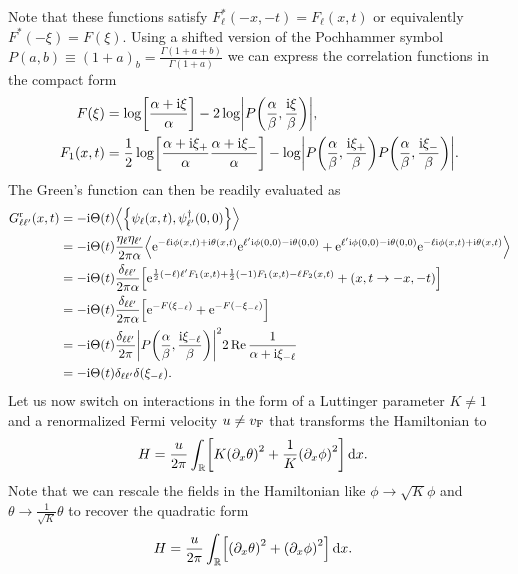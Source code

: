\documentclass[english, parskip=full]{scrartcl}
\begin{document}
Note that these functions satisfy $F_\ell^\ast(-x,-t) = F_\ell(x,t)$ or equivalently $F^\ast(-\xi) = F(\xi)$.
Using a shifted version of the Pochhammer symbol $P(a,b) \equiv (1+a)_b  = \frac{\Gamma(1+a+b)}{\Gamma(1+a)}$ we can express the correlation functions in the compact form
\begin{align}
F(\xi) &= \log\klb*{\frac{\alpha + \i\xi}{\alpha}} - 2\log\abs*{P\kla*{\frac{\alpha}{\beta}, \frac{\i\xi}{\beta}}},\\
F_1(x,t) &= \frac{1}{2} \log\klb*{\frac{\alpha + \i\xi_+}{\alpha} \frac{\alpha + \i\xi_-}{\alpha}} - \log\abs*{P\kla*{\frac{\alpha}{\beta}, \frac{\i \xi_+}{\beta}} P\kla*{\frac{\alpha}{\beta}, \frac{\i \xi_-}{\beta}}}.
\end{align}
The Green's function can then be readily evaluated as
\begin{align}
G^\r_{\ell\ell'}(x,t) &= -\i\Theta(t) \bra*{\klc*{\psi_\ell(x,t), \psi_{\ell'}^\dagger(0,0)}} \\
&= -\i\Theta(t) \frac{\eta_\ell\eta_{\ell'}}{2\pi\alpha} \bra*{\powe{-\ell\i \phi(x,t) + \i\theta(x,t)} \powe{\ell'\i \phi(0,0) - \i\theta(0,0)} + \powe{\ell'\i \phi(0,0) - \i\theta(0,0)} \powe{-\ell\i \phi(x,t) + \i\theta(x,t)} }\\
&= -\i\Theta(t) \frac{\delta_{\ell\ell'}}{2\pi\alpha} \klb*{\powe{\frac{1}{2} (-\ell)\ell' F_1(x,t) + \frac{1}{2} (-1)F_1(x,t) - \ell F_2(x,t)} + (x,t\rightarrow -x,-t)}\\
&= -\i\Theta(t) \frac{\delta_{\ell\ell'}}{2\pi\alpha} \klb*{\powe{-F\kla*{\xi_{-\ell}}} + \powe{-F\kla*{-\xi_{-\ell}}}}\\
&= -\i\Theta(t) \frac{\delta_{\ell\ell'}}{2\pi} \abs*{P\kla*{\frac{\alpha}{\beta}, \frac{\i\xi_{-\ell}}{\beta}}}^2 2\Re \frac{1}{\alpha + \i\xi_{-\ell}} \\
&= -\i\Theta(t) \delta_{\ell\ell'} \delta\kla*{\xi_{-\ell}}.
\end{align}
Let us now switch on interactions in the form of a Luttinger parameter $K\neq 1$ and a renormalized Fermi velocity $u\neq v_{\text{F}}$ that transforms the Hamiltonian to
\begin{align}
H &= \frac{u}{2\pi} \intr{\klb*{K \kla*{\partial_x\theta}^2 + \frac{1}{K} \kla*{\partial_x\phi}^2}}{x}.
\end{align}
Note that we can rescale the fields in the Hamiltonian like $\phi \rightarrow \sqrt{K} \phi$ and $\theta \rightarrow\frac{1}{\sqrt{K}} \theta$ to recover the quadratic form
\begin{align}
H &= \frac{u}{2\pi} \intr{\klb*{\kla*{\partial_x\theta}^2 + \kla*{\partial_x\phi}^2}}{x}.
\end{align}
\end{document}
